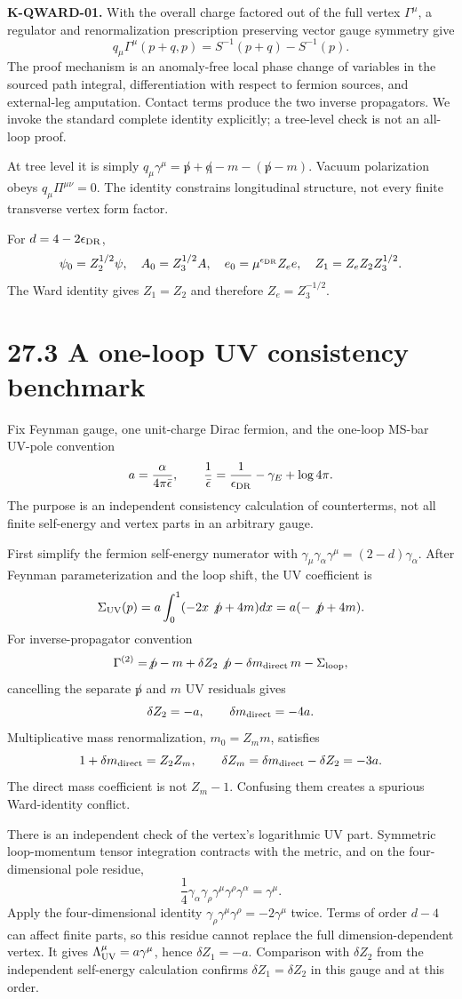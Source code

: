 \documentclass[
  11pt,
  oneside]{book}
\begin{document}
\textbf{K-QWARD-01.} With the overall charge factored out of the full
vertex \(\Gamma^\mu\), a regulator and renormalization prescription
preserving vector gauge symmetry give \[
q_\mu\Gamma^\mu(p+q,p)=S^{-1}(p+q)-S^{-1}(p).
\] The proof mechanism is an anomaly-free local phase change of
variables in the sourced path integral, differentiation with respect to
fermion sources, and external-leg amputation. Contact terms produce the
two inverse propagators. We invoke the standard complete identity
explicitly; a tree-level check is not an all-loop proof.

At tree level it is simply
\(q_\mu\gamma^\mu=\not p+\not q-m-(\not p-m)\). Vacuum polarization
obeys \(q_\mu\Pi^{\mu\nu}=0\). The identity constrains longitudinal
structure, not every finite transverse vertex form factor.

For \(d=4-2\epsilon_{\rm DR}\), \[
\psi_0=Z_2^{1/2}\psi,\quad A_0=Z_3^{1/2}A,\quad
e_0=\mu^{\epsilon_{\rm DR}}Z_e e,\quad
Z_1=Z_eZ_2Z_3^{1/2}.
\] The Ward identity gives \(Z_1=Z_2\) and therefore \(Z_e=Z_3^{-1/2}\).

\section{27.3 A one-loop UV consistency benchmark}

Fix Feynman gauge, one unit-charge Dirac fermion, and the one-loop
MS-bar UV-pole convention \[
a=\frac{\alpha}{4\pi\bar\epsilon},\qquad
\frac1{\bar\epsilon}=\frac1{\epsilon_{\rm DR}}-\gamma_E+\log4\pi.
\] The purpose is an independent consistency calculation of
counterterms, not all finite self-energy and vertex parts in an
arbitrary gauge.

First simplify the fermion self-energy numerator with
\(\gamma_\mu\gamma_\alpha\gamma^\mu=(2-d)\gamma_\alpha\). After Feynman
parameterization and the loop shift, the UV coefficient is \[
\Sigma_{\rm UV}(p)=a\int_0^1(-2x\not p+4m)dx
=a(-\not p+4m).
\] For inverse-propagator convention \[
\Gamma^{(2)}=\not p-m+\delta Z_2\not p
-\delta m_{\rm direct}\,m-\Sigma_{\rm loop},
\] cancelling the separate \(\not p\) and \(m\) UV residuals gives \[
\delta Z_2=-a,\qquad\delta m_{\rm direct}=-4a.
\] Multiplicative mass renormalization, \(m_0=Z_m m\), satisfies \[
1+\delta m_{\rm direct}=Z_2Z_m,
\qquad\delta Z_m=\delta m_{\rm direct}-\delta Z_2=-3a.
\] The direct mass coefficient is not \(Z_m-1\). Confusing them creates
a spurious Ward-identity conflict.

There is an independent check of the vertex's logarithmic UV part.
Symmetric loop-momentum tensor integration contracts with the metric,
and on the four-dimensional pole residue, \[
\frac14\gamma_\alpha\gamma_\rho\gamma^\mu
\gamma^\rho\gamma^\alpha=\gamma^\mu.
\] Apply the four-dimensional identity
\(\gamma_\rho\gamma^\mu\gamma^\rho=-2\gamma^\mu\) twice. Terms of order
\(d-4\) can affect finite parts, so this residue cannot replace the full
dimension-dependent vertex. It gives
\(\Lambda^\mu_{\rm UV}=a\gamma^\mu\), hence \(\delta Z_1=-a\).
Comparison with \(\delta Z_2\) from the independent self-energy
calculation confirms \(\delta Z_1=\delta Z_2\) in this gauge and at this
order.
\end{document}
